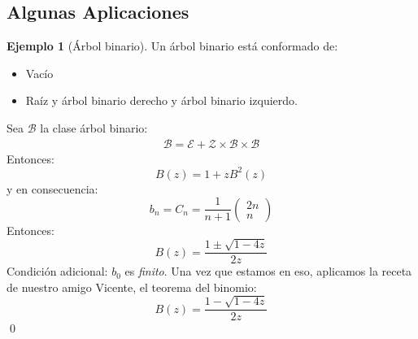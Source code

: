 \documentclass[english, spanish, fleqn, 10pt]{article}
\numberwithin{equation}{section}
\newcommand{\nparentesis}[1]{\left( #1 \right)}
\theoremstyle{definition}
\newtheorem{beforeExample}{Ejemplo}[section]
\newenvironment{ejemplo}[1][]{\begin{beforeExample}[#1]\renewcommand{\qedsymbol}{$\blacksquare$}}{\qed\end{beforeExample}}
\begin{document}
\subsection{Algunas Aplicaciones}

\begin{ejemplo}[Árbol binario]
Un árbol binario está conformado de:
\begin{itemize}
	\item Vacío
	
	\item Raíz y árbol binario derecho y árbol binario izquierdo.
\end{itemize}
Sea $\mathcal{B}$ la clase árbol binario:
\begin{align*}
\mathcal{B} = \mathcal{E} + \mathcal{Z} \times \mathcal{B}\times \mathcal{B}
\end{align*}
Entonces:
\begin{equation}
B\nparentesis{z} = 1 + zB^2\nparentesis{z}
\end{equation}
y en consecuencia:
\begin{equation}
b_n = C_n = \dfrac{1}{n+1}
\begin{pmatrix}
2n\\n
\end{pmatrix}
\end{equation}
Entonces:
\begin{equation}
B\nparentesis{z} = \dfrac{1 \pm \sqrt{1-4z}}{2z}
\end{equation}
Condición adicional: $b_0$ es \emph{finito}. Una vez que estamos en eso, aplicamos la receta de nuestro amigo Vicente, el teorema del binomio:
\begin{equation}
B\nparentesis{z} = \dfrac{1 - \sqrt{1-4z}}{2z}
\end{equation}
\end{ejemplo}
\end{document}
